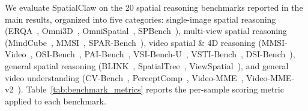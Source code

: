 \documentclass{llmxive}
\providecommand{\ours}{SpatialClaw}
\begin{document}
We evaluate \ours{} on the 20 spatial reasoning benchmarks reported in the main results, organized into five categories: single-image spatial reasoning (ERQA~\citep{team2025gemini}, Omni3D~\citep{marsili2025visual}, OmniSpatial~\citep{jia2025omnispatial}, SPBench~\citep{xu2025spbench}), multi-view spatial reasoning (MindCube~\citep{yin2025mindcube}, MMSI~\citep{yang2025mmsi}, SPAR-Bench~\citep{zhang2025from}), video spatial \& 4D reasoning (MMSI-Video~\citep{lin2025mmsivideo}, OSI-Bench~\citep{wu2025osibench}, PAI-Bench~\citep{zhou2025paibench}, VSI-Bench-U~\citep{brown2025shortcuts}, VSTI-Bench~\citep{fan2025vlm}, DSI-Bench~\citep{zhang2025dsibench}), general spatial reasoning (BLINK~\citep{fu2024blink}, SpatialTree~\citep{xiao2025spatialtree}, ViewSpatial~\citep{li2025viewspatial}), and general video understanding (CV-Bench~\citep{zhu2025cvbench}, PerceptComp~\citep{li2026perceptioncomp}, Video-MME~\citep{fu2025video}, Video-MME-v2~\citep{videommev2_2026}). 
Table~\ref{tab:benchmark_metrics} reports the per-sample scoring metric applied to each benchmark.
\end{document}
